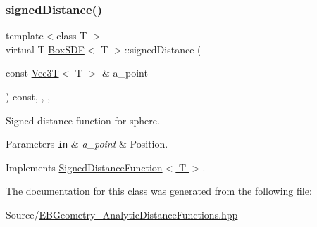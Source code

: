 \subsubsection{\texorpdfstring{signed\+Distance()}{signedDistance()}}
{\footnotesize\ttfamily template$<$class T $>$ \\
virtual T \hyperlink{classBoxSDF}{Box\+S\+DF}$<$ T $>$\+::signed\+Distance (\begin{DoxyParamCaption}\item[{const \hyperlink{classVec3T}{Vec3T}$<$ T $>$ \&}]{a\+\_\+point }\end{DoxyParamCaption}) const\hspace{0.3cm}{\ttfamily [inline]}, {\ttfamily [override]}, {\ttfamily [virtual]}, {\ttfamily [noexcept]}}



Signed distance function for sphere. 


\begin{DoxyParams}[1]{Parameters}
\mbox{\tt in}  & {\em a\+\_\+point} & Position. \\
\hline
\end{DoxyParams}


Implements \hyperlink{classSignedDistanceFunction_af5912280ca51dc21a2d6949a30ec7d21}{Signed\+Distance\+Function$<$ T $>$}.



The documentation for this class was generated from the following file\+:\begin{DoxyCompactItemize}
\item 
Source/\hyperlink{EBGeometry__AnalyticDistanceFunctions_8hpp}{E\+B\+Geometry\+\_\+\+Analytic\+Distance\+Functions.\+hpp}\end{DoxyCompactItemize}
